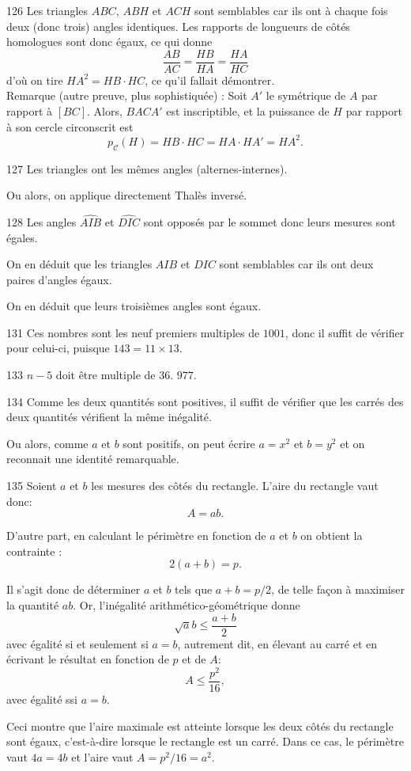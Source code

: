 \begin{Soln}{126}
Les triangles $ABC$, $ABH$ et $ACH$ sont semblables car ils ont à chaque fois deux (donc trois) angles identiques. Les rapports de longueurs de côtés homologues sont donc égaux, ce qui donne
\[ \frac{AB}{AC} = \frac{HB}{HA} = \frac{HA}{HC}\]
d'où on tire $HA^2 = HB\cdot HC$, ce qu'il fallait démontrer.\\

Remarque (autre preuve, plus sophistiquée) : Soit $A'$ le symétrique de $A$ par rapport à $[BC]$. Alors, $BACA'$ est inscriptible, et la puissance de $H$ par rapport à son cercle circonscrit est
\[ p_{\mathcal C}(H) = HB\cdot HC=  HA\cdot HA' = HA^2.\]
\end{Soln}
\begin{Soln}{127}
Les triangles ont les mêmes angles (alternes-internes).

Ou alors, on applique directement Thalès \og inversé\fg.
\end{Soln}
\begin{Soln}{128}
Les angles $\widehat{AIB}$ et $\widehat{DIC}$ sont opposés par le sommet donc leurs mesures sont égales.

On en déduit que les triangles $AIB$ et $DIC$ sont semblables car ils ont deux paires d'angles égaux.

On en déduit que leurs troisièmes angles sont égaux.
\end{Soln}
\begin{Soln}{131}
Ces nombres sont les neuf premiers multiples de $1001$, donc il suffit de vérifier pour celui-ci, puisque $143=11\times 13$.
\end{Soln}
\begin{Soln}{133}
$n-5$ doit être multiple de $36$.
$977$.
\end{Soln}
\begin{Soln}{134}
Comme les deux quantités sont positives, il suffit de vérifier que les carrés des deux quantités vérifient la même inégalité.

Ou alors, comme $a$ et $b$ sont positifs, on peut écrire $a=x^2$ et $b=y^2$ et on reconnait une identité remarquable.
\end{Soln}
\begin{Soln}{135}
Soient $a$ et $b$ les mesures des côtés du rectangle. L'aire du rectangle vaut donc:
\[ A=ab.\]

D'autre part, en  calculant le périmètre en fonction de $a$ et $b$ on obtient la contrainte :
\[ 2(a+b)=p.\]

Il s'agit donc de déterminer $a$ et $b$ tels que $a+b=p/2$, de telle façon à maximiser la quantité $ab$. Or, l'inégalité arithmético-géométrique donne
\[ \sqrt ab \leq \frac{a+b}{2} \]
avec égalité si et seulement si $a=b$, autrement dit, en élevant au carré et en écrivant le résultat en fonction de $p$ et de $A$:
\[ A \leq \frac{p^2}{16},\]
avec égalité ssi $a=b$.

Ceci montre que l'aire maximale est atteinte lorsque les deux côtés du rectangle sont égaux, c'est-à-dire lorsque le rectangle est un carré. Dans ce cas, le périmètre vaut $4a=4b$ et l'aire vaut $A=p^2/16 = a^2$.
\end{Soln}

